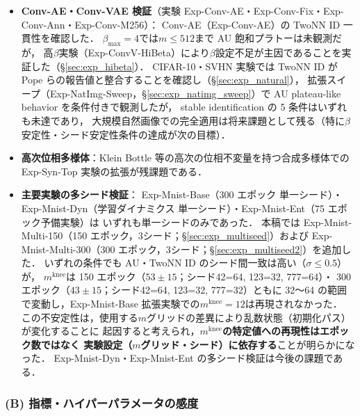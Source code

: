 \documentclass[11pt,a4paper]{jsarticle}
\newcommand{\mknee}{m^{\mathrm{knee}}}
\begin{document}
\begin{itemize}
  \item \textbf{Conv-AE・Conv-VAE 検証}（実験 Exp-Conv-AE・Exp-Conv-Fix・Exp-Conv-Ann・Exp-Conv-M256）：
        Conv-AE（Exp-Conv-AE）の TwoNN ID 一貫性を確認した．
        $\beta_{\max}=4$では$m \leq 512$まで AU 飽和プラトーは未観測だが，
        高$\beta$実験（Exp-ConvV-HiBeta）により$\beta$設定不足が主因であることを実証した（§\ref{sec:exp_hibeta}）．
        CIFAR-10・SVHN 実験では TwoNN ID が Pope ら\cite{pope2021intrinsic}の報告値と整合することを確認し（§\ref{sec:exp_natural}），
        拡張スイープ（Exp-NatImg-Sweep，§\ref{sec:exp_natimg_sweep}）で AU plateau-like behavior を条件付きで観測したが，
        stable identification の 5 条件はいずれも未達であり，
        大規模自然画像での完全適用は将来課題として残る（特に$\beta$安定性・シード安定性条件の達成が次の目標）．
  \item \textbf{高次位相多様体}：Klein Bottle 等の高次の位相不変量を持つ合成多様体での
        Exp-Syn-Top 実験の拡張が残課題である．
  \item \textbf{主要実験の多シード検証}：
        Exp-Mnist-Base（300 エポック 単一シード）・Exp-Mnist-Dyn（学習ダイナミクス 単一シード）・Exp-Mnist-Ent（75 エポック予備実験）は
        いずれも単一シードのみであった．
        本稿では Exp-Mnist-Multi-150（150 エポック，3シード；§\ref{sec:exp_multiseed}）および
        Exp-Mnist-Multi-300（300 エポック，3シード；§\ref{sec:exp_multiseed2}）を追加した．
        いずれの条件でも AU・TwoNN ID のシード間一致は高い（$\sigma \leq 0.5$）が，
        $\mknee$は 150 エポック（$53 \pm 15$；シード42=64, 123=32, 777=64）・
        300 エポック（$43 \pm 15$；シード42=64, 123=32, 777=32）ともに
        32〜64 の範囲で変動し，Exp-Mnist-Base 拡張実験での$\mknee = 12$は再現されなかった．
        この不安定性は，使用する$m$グリッドの差異により乱数状態（初期化パス）が変化することに
        起因すると考えられ，\textbf{$\mknee$の特定値への再現性はエポック数ではなく
        実験設定（$m$グリッド・シード）に依存する}ことが明らかになった．
        Exp-Mnist-Dyn・Exp-Mnist-Ent の多シード検証は今後の課題である．
\end{itemize}

\subsubsection*{(B) 指標・ハイパーパラメータの感度}
\end{document}
